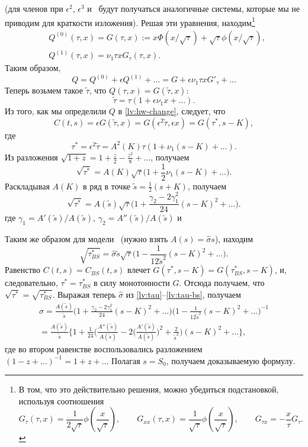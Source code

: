 (для членов при $\epsilon^2$, $\epsilon^3$ и \td\ будут получаться аналогичные системы, которые мы не приводим для краткости изложения).
Решая эти уравнения, находим\footnote{В том, что это действительно решения, можно убедиться подстановкой, используя соотношения
\[
G_\tau(\tau, x) = \frac{1}{2\sqrt\tau}\phi\left(\frac{x}{\sqrt\tau}\right), \qquad 
G_{xx}(\tau, x) = \frac{1}{\sqrt\tau}\phi\left(\frac{x}{\sqrt\tau}\right), \qquad 
G_{\tau x} = -\frac{x}{\tau} G_\tau.
\]
}
\begin{align*}
&Q^{(0)}(\tau,x) = G(\tau,x) 
  := x \Phi(x/\sqrt\tau) + \sqrt\tau \phi(x/\sqrt{\tau}),\\
&Q^{(1)}(\tau,x) = \nu_1\tau x G_\tau(\tau,x).
\end{align*}
Таким образом, 
\[
Q = Q^{(0)} + \epsilon Q^{(1)} +\ldots = G + \epsilon\nu_1\tau x G'_\tau + \ldots
\]
Теперь возьмем такое $\tilde\tau$, что $Q(\tau,x) = G(\tilde \tau,x)$:
\[
\tilde \tau = \tau(1 + \epsilon\nu_1x + \ldots).
\]
Из того, как мы определили $Q$ в \eqref{lv:hw-change}, следует, что 
\[
C(t,s) = \epsilon G(\tilde \tau,x) = G(\epsilon^2\tilde\tau, \epsilon x) =
G(\tau^*, s-K),
\]
где
\[
\tau^* = \epsilon^2\tilde\tau 
= A^2(K)\tau (1 + \nu_1(s-K) + \ldots). 
\]
Из разложения $\sqrt{1+z} = 1 + \frac z2 - \frac{z^2}{8} + \ldots$, получаем
\[
\sqrt{\tau^*} = A(K)\sqrt{\tau} 
\biggl( 1 + \frac12 \nu_1 (s-K) + \ldots
\biggr).
\]
Раскладывая $A(K)$ в ряд в точке $\tilde s=\frac12 (s+K)$, получаем
\begin{equation}
\label{lv:tau}
\sqrt{\tau^*} = A(\tilde s) \sqrt\tau 
\biggl(1 
  + \frac{\gamma_2 - 2\gamma_1^2}{24}(s-K)^2 
  + \ldots 
\biggr).
\end{equation}
где $\gamma_1 = A'(\tilde s)/A(\tilde s)$, $\gamma_2 = A''(\tilde s)/A(\tilde s)$ и \td

Таким же образом для модели \bs\  (нужно взять $A(s) = \hat\sigma s$), находим
\begin{equation}
\label{lv:tau-bs}
\sqrt{\tau^*_{BS}} = \hat\sigma \tilde s \sqrt{\tau} 
\biggl(1 
  - \frac{1}{12\tilde s^2} (s-K)^2
  + \ldots
\biggr).
\end{equation}
Равенство $C(t,s) = C_{BS}(t,s)$ влечет $G(\tau^*,s-K) = G(\tau^*_{BS}, s-K)$, и, следовательно, $\tau^* = \tau^*_{BS}$ в силу монотонности $G$. Отсюда получаем, что $\sqrt{\tau^*} = \sqrt{\tau^*_{BS}}$.
Выражая теперь $\hat\sigma$ из \eqref{lv:tau}--\eqref{lv:tau-bs}, получаем
\begin{multline*}
\hat\sigma = \frac{A(\tilde s)}{\tilde s} \biggl(1 + \frac{\gamma_2 - 2\gamma_1^2}{24}(s-K)^2  + \ldots  \biggr)
\biggl(1 - \frac{1}{12\tilde s^2} (s-K)^2 + \ldots \biggr)^{-1} \\= 
\frac{A(\tilde s)}{\tilde s} 
\biggl\{1 
+ \frac1{24} 
  \biggl(
    \frac{A''(\tilde s)}{A(\tilde s)} - 2\biggl(\frac{A'(\tilde s)}{A(\tilde s)}\biggr)^2 + \frac{2}{\tilde s^2}
  \biggr) (s-K)^2 + \ldots\biggr\},
\end{multline*}
где во втором равенстве воспользовались разложением $(1-z+\ldots)^{-1} = 1 + z + \ldots$
Полагая $s=S_0$, получаем доказываемую формулу.
